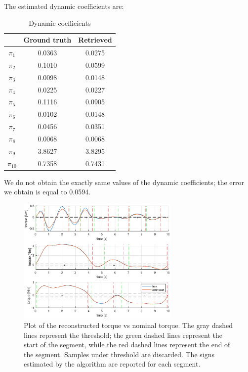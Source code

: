 \documentclass{article}
\begin{document}
The estimated dynamic coefficients are:

\begin{table}[!htbp]
\centering
\begin{tabular}{|c|cc|}
\hline
& Ground truth & Retrieved\\ 
\hline
$\pi_1$ & 0.0363 & 0.0275\\
$\pi_2$ & 0.1010 & 0.0599\\
$\pi_3$ & 0.0098 & 0.0148\\
$\pi_4$ &  0.0225 &  0.0227\\
$\pi_5$ & 0.1116 & 0.0905\\
$\pi_6$ & 0.0102 & 0.0148\\
$\pi_7$ & 0.0456 & 0.0351\\
$\pi_8$ & 0.0068 & 0.0068\\
$\pi_9$ & 3.8627 & 3.8295\\
$\pi_{10}$ & 0.7358 & 0.7431\\
\hline
\end{tabular}
\caption{Dynamic coefficients}
\end{table}
\FloatBarrier

We do not obtain the exactly same values of the dynamic coefficients; the error we obtain is equal to 0.0594.

\begin{figure}[!htbp]
\centering
\includegraphics[width=0.7\textwidth]{images/3-dof/results1.eps}
\caption{Plot of the reconstructed torque vs nominal torque. The gray dashed lines represent the threshold; the green dashed lines represent the start of the segment, while the red dashed lines represent the end of the segment. Samples under threshold are discarded. The signs estimated by the algorithm are reported for each segment.}
\end{figure}
\FloatBarrier
\end{document}
